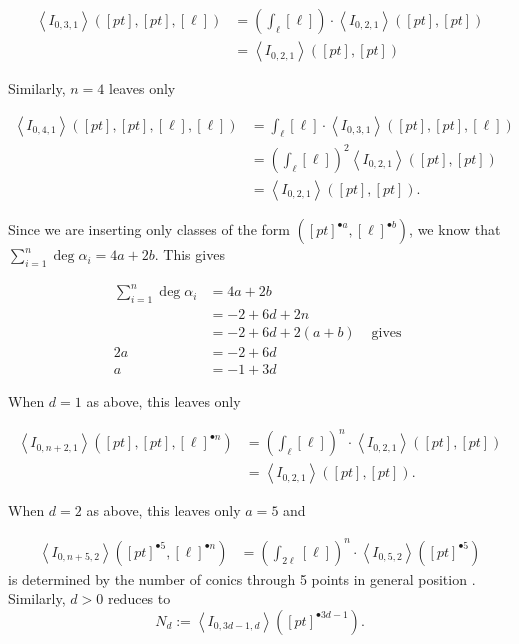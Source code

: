 \documentclass{amsart}
\begin{document}
\begin{align*}
    \left<I_{0,3,1}\right>([pt],[pt],[\ell]) &= \left( \int_\ell [\ell]\right) \cdot \left< I_{0,2,1}\right>\left([pt],[pt]\right)\\
    &= \left<I_{0,2,1}\right>([pt],[pt])
\end{align*} 

Similarly, $n=4$ leaves only 

\begin{align*}
    \left<I_{0,4,1}\right>([pt],[pt],[\ell],[\ell]) &= \int_\ell[\ell] \cdot \left<I_{0,3,1}\right>([pt],[pt],[\ell])\\
    &= \left( \int_\ell [\ell] \right)^2 \left< I_{0,2,1}\right> ([pt],[pt])\\
    &= \left< I_{0,2,1} \right>([pt],[pt]).
\end{align*}

Since we are inserting only classes of the form $([pt]^{\bullet a},[\ell]^{\bullet b})$, we know that $\sum_{i=1}^n\deg \alpha_i = 4a + 2b$. This gives

\begin{align*}
    \sum_{i=1}^n \deg\alpha_i &= 4a + 2b\\
    &= -2+6d+2n\\
    &= -2 + 6d + 2(a+b) &\text{ gives }\\
    2a &= -2 + 6d\\
    a&= -1+ 3d
\end{align*}



When $d=1$ as above, this leaves only 

\begin{align*}
     \left< I_{0,n+2,1}\right>([pt],[pt], [\ell]^{\bullet n}) &= \left( \int_\ell [\ell] \right)^n \cdot \left< I_{0,2,1} \right> ([pt],[pt]) \\
     &= \left< I_{0,2,1}\right>([pt],[pt]).\end{align*}

When $d=2$ as above, this leaves only $a=5$ and

\begin{align*}
    \left<I_{0,n+5,2}\right>([pt]^{\bullet 5},[\ell]^{\bullet n}) &= \left( \int_{2\ell} [\ell]\right)^n \cdot \left<I_{0,5,2}\right>([pt]^{\bullet 5} )
\end{align*} is determined by the number of conics through 5 points in general position \cite{coxkatxMSAG}. Similarly, $d>0$ reduces to \[ N_d := \left<I_{0,3d-1,d}\right>([pt]^{\bullet 3d-1} ). \] 
\end{document}
